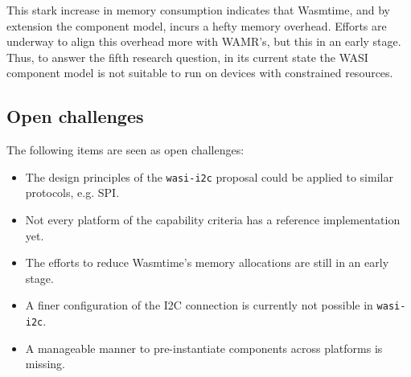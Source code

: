 This stark increase in memory consumption indicates that Wasmtime, and by extension the component model, incurs a hefty memory overhead. Efforts are underway to align this overhead more with WAMR's, but this in an early stage. Thus, to answer the fifth research question, in its current state the \gls{WASI} component model is not suitable to run on devices with constrained resources.

\subsection*{Open challenges}

The following items are seen as open challenges:

\begin{itemize}
    \item The design principles of the \texttt{wasi-i2c} proposal could be applied to similar protocols, e.g. \gls{SPI}.
    \item Not every platform of the capability criteria has a reference implementation yet.
    \item The efforts to reduce Wasmtime's memory allocations are still in an early stage.
    \item A finer configuration of the \gls{I2C} connection is currently not possible in \texttt{wasi-i2c}.
    \item A manageable manner to pre-instantiate components across platforms is missing. 
\end{itemize}
